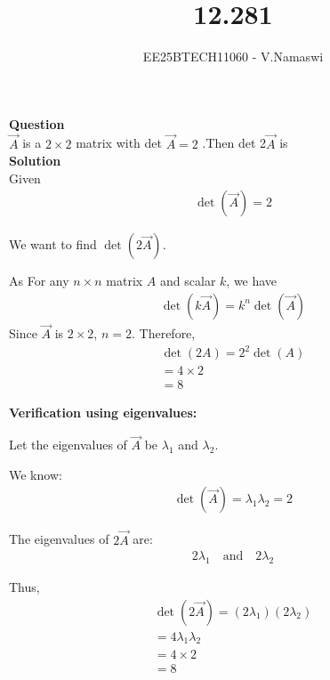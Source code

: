 \documentclass[journal]{IEEEtran}
\begin{document}

\vspace{3cm}

\title{12.281}
\author{EE25BTECH11060 - V.Namaswi}
{\let\newpage\relax\maketitle}
\renewcommand{\thefigure}{\theenumi}
\renewcommand{\thetable}{\theenumi}
\setlength{\intextsep}{10pt} %
\textbf{Question}\\
$\Vec{A}$ is a $2 \times 2$ matrix with det $\Vec{A}=2$ .Then det 2$\Vec{A}$  is\\
\textbf{Solution}\\
 Given  
\begin{align}
    \det(\Vec{A}) = 2
\end{align}

We want to find \(\det(2\Vec{A})\).

As
For any \( n \times n \) matrix \( A \) and scalar \( k \), we have
\begin{align}
\det(k\Vec{A}) = k^n \det(\Vec{A})
\end{align}
Since \( \Vec{A} \) is \( 2 \times 2 \), \( n = 2 \). Therefore,
\begin{align}
    \det(2A) = 2^2 \det(A) \\= 4 \times 2 \\= 8
\end{align}

\bigskip

\textbf{Verification using eigenvalues:}

Let the eigenvalues of \( \Vec{A} \) be \( \lambda_1 \) and \( \lambda_2 \).

We know:
\begin{align}
\det(\Vec{A}) = \lambda_1 \lambda_2 = 2
\end{align}

The eigenvalues of \( 2\Vec{A} \) are:
\begin{align}
2\lambda_1 \quad \text{and} \quad 2\lambda_2
\end{align}

Thus,
\begin{align}
\det(2\Vec{A}) = (2\lambda_1)(2\lambda_2)\\ = 4 \lambda_1 \lambda_2 \\= 4 \times 2 \\= 8
\end{align}
\end{document}

